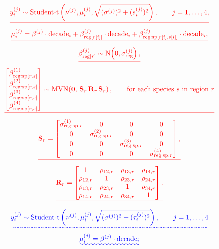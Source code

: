 \documentclass[9pt,twocolumn,twoside]{pnas-new}
\providecommand{\DIFadd}[1]{{\protect\color{blue}\uwave{#1}}} %
\providecommand{\DIFdel}[1]{{\protect\color{red}\sout{#1}}} %
\providecommand{\DIFaddbegin}{} %
\providecommand{\DIFdelend}{} %
\begin{document}
{%
\begin{gather*}
\DIFdel{y_{i}^{(j)} \sim \operatorname{Student\text{-}t}
\left(\nu^{(j)}, 
\mu_{i}^{(j)}, 
\sqrt{(\sigma^{(j)})^{2} + (s^{(j)}_{i})^{2}}
\right),
\qquad j=1,\dots,4, 
}\\
\DIFdel{\mu_{i}^{(j)} =
\beta^{(j)} \cdot \text{decade}_{i}
+ \beta_{\text{reg}[r[i]]}^{(j)} \cdot \text{decade}_{i}
+ \beta_{\text{reg:sp}[r[i],s[i]]}^{(j)} \cdot \text{decade}_{i}%
,
}\\
\DIFdel{\beta_{\text{reg}[r]}^{(j)} \sim 
\operatorname{N}\!\left(0,\sigma_{\text{reg}}^{(j)}\right),
}\\
\DIFdel{\begin{bmatrix}
\beta_{\text{reg:sp}[r,s]}^{(1)} \\
\beta_{\text{reg:sp}[r,s]}^{(2)} \\
\beta_{\text{reg:sp}[r,s]}^{(3)} \\
\beta_{\text{reg:sp}[r,s]}^{(4)}
\end{bmatrix}
\sim 
\operatorname{MVN}\!\left(
\mathbf{0},\,
\mathbf{S}_{r}\,\mathbf{R}_{r}\,\mathbf{S}_{r}
\right),
\qquad \text{for each species}~s~\text{in region}~r
}\\
\DIFdel{\mathbf{S}_{r} =
\begin{bmatrix}
\sigma^{(1)}_{\text{reg:sp},r} & 0 & 0 & 0 \\
0 & \sigma^{(2)}_{\text{reg:sp},r} & 0 & 0 \\
0 & 0 & \sigma^{(3)}_{\text{reg:sp},r} & 0 \\
0 & 0 & 0 & \sigma^{(4)}_{\text{reg:sp},r}
\end{bmatrix},
}\\
\DIFdel{\mathbf{R}_{r} =
\begin{bmatrix}
1 & \rho_{12,r} & \rho_{13,r} & \rho_{14,r} \\
\rho_{12,r} & 1 & \rho_{23,r} & \rho_{24,r} \\
\rho_{13,r} & \rho_{23,r} & 1 & \rho_{34,r} \\
\rho_{14,r} & \rho_{24,r} & \rho_{34,r} & 1
\end{bmatrix}.
}\end{gather*}%
\DIFdelend \DIFaddbegin \begin{gather}
\DIFadd{y_{i}^{(j)} \sim \operatorname{Student\text{-}t}
\left(\nu^{(j)}, 
\mu_{i}^{(j)}, 
\sqrt{(\sigma^{(j)})^{2} + (\tau^{(j)}_{i})^{2}}
\right),
\qquad j=1,\dots,4 \label{eq:likelihood}
}\\
\DIFadd{\mu_{i}^{(j)} =
\beta^{(j)} \cdot \text{decade}_{i}
}
\end{gather}}
\end{document}
